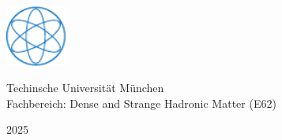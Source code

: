 \documentclass[12pt,twoside]{article}
\begin{document}
{  
  \vspace*{\fill}
  
  
  
  \includegraphics[width=0.15\textwidth]{Figures/PH_CMYK-eps-converted-to.pdf}
  \\[0.3\baselineskip] %
  
  \null
  \vfill
  
  \vspace{1em}
  \large Techinsche Universit\"at M\"unchen\\
   \vspace{0.5em}
  \large Fachbereich: Dense and Strange Hadronic Matter (E62)\\
  \vspace{0.5em}
  
  {\scshape 2025} \\[0.3\baselineskip] %
  
}

\newpage\null\thispagestyle{empty}\newpage



\newpage\null\thispagestyle{empty}\newpage

%

\newpage\null\thispagestyle{empty}\newpage


\restoregeometry
{}
\setcounter{page}{1}
\tableofcontents
\newpage
{}
\pagestyle{headings}


\newpage\null\thispagestyle{empty}\newpage


\newpage\null\thispagestyle{empty}\newpage


%
\newpage
\appendix

%
%
%
%
%
%
%
%
\newpage\null\thispagestyle{empty}\newpage


%
\end{document}
